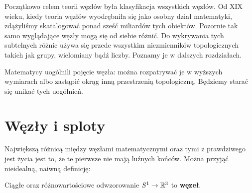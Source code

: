 \begin{figure}[H]
\begin{minipage}[b]{.11\linewidth}
	\end{minipage}
\end{figure}

Początkowo celem teorii węzłów była klasyfikacja wszystkich węzłów.
Od XIX wieku, kiedy teoria węzłów wyodrębniła się jako osobny dział matematyki,
zdążyliśmy skatalogować ponad sześć miliardów tych obiektów.
Pozornie tak samo wyglądające węzły mogą się od siebie różnić.
Do wykrywania tych subtelnych różnic używa się przede wszystkim niezmienników topologicznych takich jak grupy, wielomiany bądź liczby.
Poznamy je w dalszych rozdziałach.

Matematycy uogólnili pojęcie węzła:
można rozpatrywać je w wyższych wymiarach albo zastąpić okrąg inną przestrzenią topologiczną.
Będziemy starać się unikać tych uogólnień.

\section{Węzły i sploty}
Największą różnicą między węzłami matematycznymi oraz tymi z prawdziwego jest życia jest to, że te pierwsze nie mają luźnych końców.
Można przyjąć nieidealną, naiwną definicję:

\begin{definition}
	Ciągłe oraz różnowartościowe odwzorowanie $S^1 \to \mathbb R^3$ to \textbf{węzeł}.
\end{definition}


